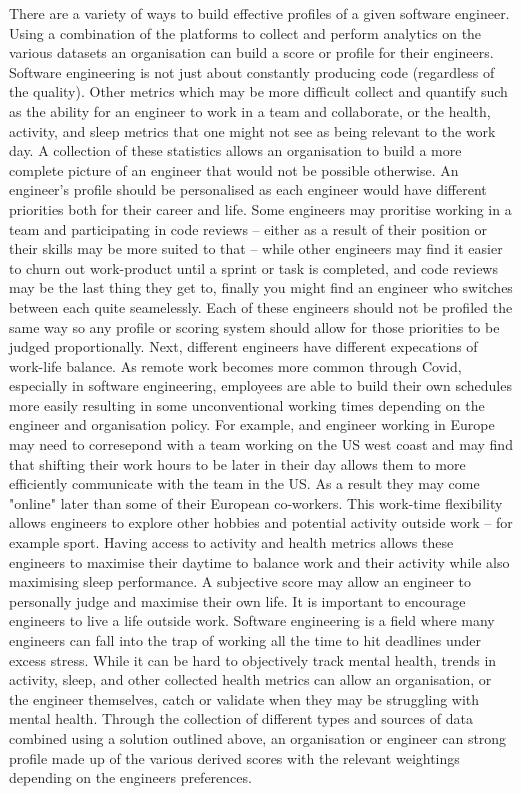 \documentclass[11pt, a4paper]{article}
\begin{document}
    There are a variety of ways to build effective profiles of a given software engineer. Using a combination of the platforms to collect and perform analytics on the various datasets an organisation can build a score or profile for their engineers. Software engineering is not just about constantly producing code (regardless of the quality). Other metrics which may be more difficult collect and quantify such as the ability for an engineer to work in a team and collaborate, or the health, activity, and sleep metrics that one might not see as being relevant to the work day. A collection of these statistics allows an organisation to build a more complete picture of an engineer that would not be possible otherwise. An engineer's profile should be personalised as each engineer would have different priorities both for their career and life. Some engineers may proritise working in a team and participating in code reviews -- either as a result of their position or their skills may be more suited to that -- while other engineers may find it easier to churn out work-product until a sprint or task is completed, and code reviews may be the last thing they get to, finally you might find an engineer who switches between each quite seamelessly. Each of these engineers should not be profiled the same way so any profile or scoring system should allow for those priorities to be judged proportionally. Next, different engineers have different expecations of work-life balance. As remote work becomes more common through Covid, especially in software engineering, employees are able to build their own schedules more easily resulting in some unconventional working times depending on the engineer and organisation policy. For example, and engineer working in Europe may need to corresepond with a team working on the US west coast and may find that shifting their work hours to be later in their day allows them to more efficiently communicate with the team in the US. As a result they may come "online" later than some of their European co-workers. This work-time flexibility allows engineers to explore other hobbies and potential activity outside work -- for example sport. Having access to activity and health metrics allows these engineers to maximise their daytime to balance work and their activity while also maximising sleep performance. A subjective score may allow an engineer to personally judge and maximise their own life. It is important to encourage engineers to live a life outside work. Software engineering is a field where many engineers can fall into the trap of working all the time to hit deadlines under excess stress. While it can be hard to objectively track mental health, trends in activity, sleep, and other collected health metrics can allow an organisation, or the engineer themselves, catch or validate when they may be struggling with mental health.\newline
    Through the collection of different types and sources of data combined using a solution outlined above, an organisation or engineer can strong profile made up of the various derived scores with the relevant weightings depending on the engineers preferences.
\end{document}
